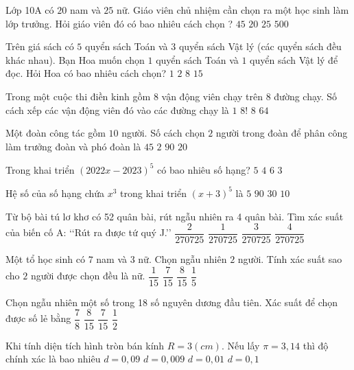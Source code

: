 \begin{ex}
	Lớp 10A có $20$ nam và $25$ nữ. Giáo viên chủ nhiệm cần chọn ra một học sinh làm lớp trưởng. Hỏi giáo viên đó có bao nhiêu cách chọn ?
	\choice
	{$45$}
	{$20$}
	{$25$}
	{$500$}
\end{ex}
\begin{ex}
	Trên giá sách có $5$ quyển sách Toán và $3$ quyển sách Vật lý (các quyển sách đều khác nhau). Bạn Hoa muốn chọn $1$ quyển sách Toán và $1$ quyển sách Vật lý để đọc. Hỏi Hoa có bao nhiêu cách chọn?
	\choice
	{$1$}
	{$2$}
	{$8$}
	{$15$}
\end{ex}
\begin{ex}
	Trong một cuộc thi điền kinh gồm $8$ vận động viên chạy trên $8$ đường chạy. Số cách xếp các vận động viên đó vào các đường chạy là 
	\choice
	{$1$}
	{$8!$}
	{$8$}
	{$64$}
\end{ex}
\begin{ex}
	Một đoàn công tác gồm $10$ người. Số cách chọn $2$ người trong đoàn để phân công làm trưởng đoàn và phó đoàn là 
	\choice
	{$45$}
	{$2$}
	{$90$}
	{$20$}
\end{ex}
\begin{ex}
	Trong khai triển $(2022x-2023)^5$ có bao nhiêu số hạng?
	\choice
	{$5$}
	{$4$}
	{$6$}
	{$3$}
\end{ex}
\begin{ex}
Hệ số của số hạng chứa $x^3$ trong khai triển ${{(x+3)}^5}$ là
\choice
{$5$}
{$90$}
{$30$}
{$10$}
\end{ex}
\begin{ex}
Từ bộ bài tú lơ khơ có 52 quân bài, rút ngẫu nhiên ra 4 quân bài. Tìm xác suất của biến cố A: 
\lq\lq Rút ra được tứ quý J.\rq\rq
\choice
{$\dfrac{2}{270725}$}
{$\dfrac{1}{270725}$}
{$\dfrac{3}{270725}$}
{$\dfrac{4}{270725}$}
\end{ex}
\begin{ex}
Một tổ học sinh có $7$ nam và $3$ nữ. Chọn ngẫu nhiên $2$ người. Tính xác suất sao cho $2$ người được chọn đều là nữ.
\choice
{$\dfrac{1}{15}$}
{$\dfrac{7}{15}$}
{$\dfrac{8}{15}$}
{$\dfrac{1}{5}$}
\end{ex}
\begin{ex}
Chọn ngẫu nhiên một số trong 18 số nguyên dương đầu tiên. Xác suất để chọn được số lẻ
bằng
\choice
{$\dfrac{7}{8}$}
{$\dfrac{8}{15}$}
{$\dfrac{7}{15}$}
{$\dfrac{1}{2}$}
\end{ex}
\begin{ex}
Khi tính diện tích hình tròn bán kính $R=3(cm)$. Nếu lấy $\pi =3{,}14$ thì độ chính xác là bao nhiêu
\choice
{$d=0{,}09$}
{$d=0{,}009$}
{$d=0{,}01$}
{$d=0{,}1$}
\end{ex}
